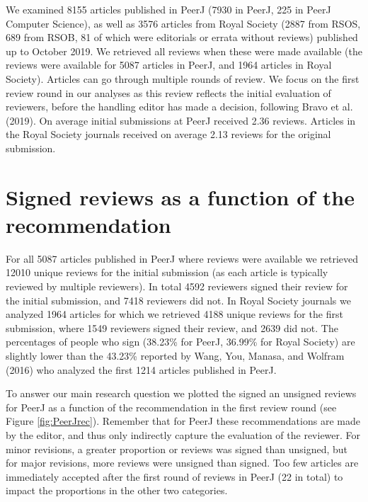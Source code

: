 \documentclass[,jou, a4paper,floatsintext]{apa6}
\begin{document}
We examined 8155 articles published in PeerJ (7930 in PeerJ, 225 in PeerJ Computer Science), as well as 3576 articles from Royal Society (2887 from RSOS, 689 from RSOB, 81 of which were editorials or errata without reviews) published up to October 2019. We retrieved all reviews when these were made available (the reviews were available for 5087 articles in PeerJ, and 1964 articles in Royal Society). Articles can go through multiple rounds of review. We focus on the first review round in our analyses as this review reflects the initial evaluation of reviewers, before the handling editor has made a decision, following Bravo et al. (2019). On average initial submissions at PeerJ received 2.36 reviews. Articles in the Royal Society journals received on average 2.13 reviews for the original submission.

\hypertarget{signed-reviews-as-a-function-of-the-recommendation}{%
\section{Signed reviews as a function of the recommendation}\label{signed-reviews-as-a-function-of-the-recommendation}}

For all 5087 articles published in PeerJ where reviews were available we retrieved 12010 unique reviews for the initial submission (as each article is typically reviewed by multiple reviewers). In total 4592 reviewers signed their review for the initial submission, and 7418 reviewers did not. In Royal Society journals we analyzed 1964 articles for which we retrieved 4188 unique reviews for the first submission, where 1549 reviewers signed their review, and 2639 did not. The percentages of people who sign (38.23\% for PeerJ, 36.99\% for Royal Society) are slightly lower than the 43.23\% reported by Wang, You, Manasa, and Wolfram (2016) who analyzed the first 1214 articles published in PeerJ.

To answer our main research question we plotted the signed an unsigned reviews for PeerJ as a function of the recommendation in the first review round (see Figure \ref{fig:PeerJrec}). Remember that for PeerJ these recommendations are made by the editor, and thus only indirectly capture the evaluation of the reviewer. For minor revisions, a greater proportion or reviews was signed than unsigned, but for major revisions, more reviews were unsigned than signed. Too few articles are immediately accepted after the first round of reviews in PeerJ (22 in total) to impact the proportions in the other two categories.
\end{document}
